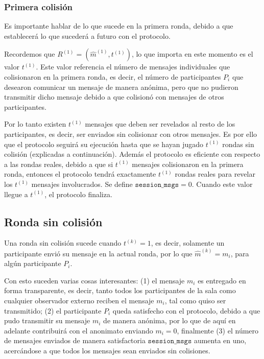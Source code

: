 \subsubsection{Primera colisión}

Es importante hablar de lo que sucede en la primera ronda, debido a que establecerá lo que sucederá a futuro con el protocolo.

Recordemos que $R^{(1)} = (\hat{m}^{(1)}, t^{(1)})$, lo que importa en este momento es el valor $t^{(1)}$. Este valor referencia el número de mensajes individuales que colisionaron en la primera ronda, es decir, el número de participantes $P_i$ que desearon comunicar un mensaje de manera anónima, pero que no pudieron transmitir dicho mensaje debido a que colisionó con mensajes de otros participantes.

Por lo tanto existen $t^{(1)}$ mensajes que deben ser revelados al resto de los participantes, es decir, ser enviados sin colisionar con otros mensajes. Es por ello que el protocolo seguirá su ejecución hasta que se hayan jugado $t^{(1)}$ rondas sin colisión (explicadas a continuación). Además el protocolo es eficiente con respecto a las rondas reales, debido a que si $t^{(1)}$ mensajes colisionaron en la primera ronda, entonces el protocolo tendrá exactamente $t^{(1)}$ rondas reales para revelar los $t^{(1)}$ mensajes involucrados. Se define $\mathtt{session\_msgs} = 0$. Cuando este valor llegue a $t^{(1)}$, el protocolo finaliza.

\subsection{Ronda sin colisión}

Una ronda sin colisión sucede cuando $t^{(k)} = 1$, es decir, solamente un participante envió su mensaje en la actual ronda, por lo que $\hat{m}^{(k)} = m_i$, para algún participante $P_i$.

Con esto suceden varias cosas interesantes: (1) el mensaje $m_i$ es entregado en forma transparente, es decir, tanto todos los participantes de la sala como cualquier observador externo reciben el mensaje $m_i$, tal como quiso ser transmitido; (2) el participante $P_i$ queda satisfecho con el protocolo, debido a que pudo transmitir su mensaje $m_i$ de manera anónima, por lo que de aquí en adelante contribuirá con el anonimato enviando $m_i = 0$, finalmente (3) el número de mensajes enviados de manera satisfactoria $\mathtt{session\_msgs}$ aumenta en uno, acercándose a que todos los mensajes sean enviados sin colisiones.

